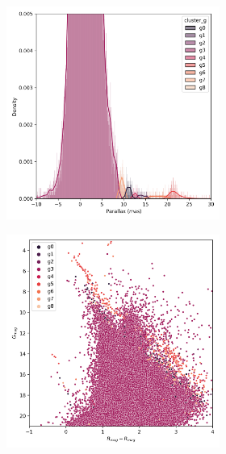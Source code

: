 \documentclass[11pt, a4paper, english]{book}
\begin{document}
\begin{figure}[H]
\begin{subfigure}{0.9\textwidth}
\begin{subfigure}[t]{0.30\textwidth}
    \end{subfigure}
    \hfill
    \begin{subfigure}[t]{0.30\textwidth}
      \centering
      \includegraphics[width=\textwidth]{../figures/melotte_25/dec_parallax_melotte_25.png}
    \end{subfigure}
    \hfill
    \begin{subfigure}[t]{0.30\textwidth}
      \centering
      \includegraphics[width=\textwidth]{../figures/melotte_25/dec_hr_diagram_melotte_25.png}

\end{subfigure}
\end{subfigure}
\end{figure}
\end{document}
